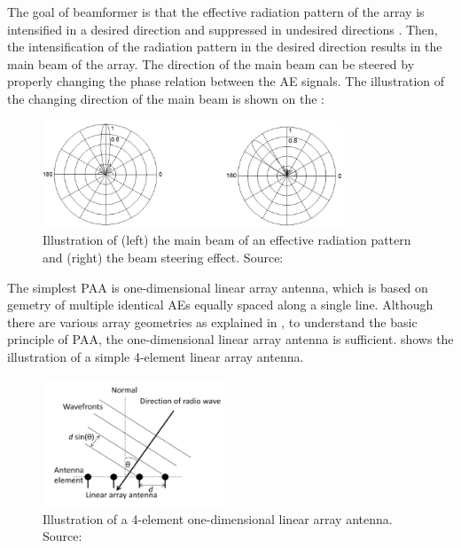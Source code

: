 The goal of beamformer is that the effective radiation pattern of the array is intensified in a desired direction and suppressed in undesired directions \citep{cheng1989field,balanis2008modern}. Then, the intensification of the radiation pattern in the desired direction results in the main beam of the array. The direction of the main beam can be steered by properly changing the phase relation between the AE signals. The illustration of the changing direction of the main beam is shown on the :

\begin{figure}[h]
	\centering
	\includegraphics[width=0.8\textwidth]{images/beamformer_illustration}
	\caption{Illustration of (left) the main beam of an effective radiation pattern and (right) the beam steering effect. Source: \citep{zhuang2010ring}}
	\label{fig:beamformer_illustration}
\end{figure}

The simplest PAA is one-dimensional linear array antenna, which is based on gemetry of multiple identical AEs equally spaced along a single line. Although there are various array geometries as explained in \citep{cheng1989field,balanis2008modern}, to understand the basic principle of PAA, the one-dimensional linear array antenna is sufficient.  shows the illustration of a simple 4-element linear array antenna.

\begin{figure}[h]
	\centering
	\includegraphics[width=0.5\textwidth]{images/linear_array_antenna}
	\caption{Illustration of a 4-element one-dimensional linear array antenna. Source: \citep{zhuang2010ring}}
	\label{fig:linear_array_antenna}
\end{figure}

